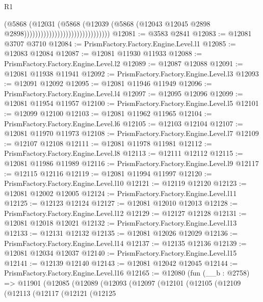 \begin{lexlean}{R1}
\begin{coremodule}
                                                      (@5868
                                                        (@12031
                                                          (@5868
                                                            (@12039
                                                              (@5868
                                                                (@12043
                                                                  @12045
                                                                  @2898
                                                                  @2898)))))))))))))))))))))))))))))))
@12081 := @3583 @2841
@12083 := @12081 @3707 @3710
@12084 := PrismFactory.Factory.Engine.Level.l1
@12085 := @12083 @12084
@12087 := @12081 @11930 @11933
@12088 := PrismFactory.Factory.Engine.Level.l2
@12089 := @12087 @12088
@12091 := @12081 @11938 @11941
@12092 := PrismFactory.Factory.Engine.Level.l3
@12093 := @12091 @12092
@12095 := @12081 @11946 @11949
@12096 := PrismFactory.Factory.Engine.Level.l4
@12097 := @12095 @12096
@12099 := @12081 @11954 @11957
@12100 := PrismFactory.Factory.Engine.Level.l5
@12101 := @12099 @12100
@12103 := @12081 @11962 @11965
@12104 := PrismFactory.Factory.Engine.Level.l6
@12105 := @12103 @12104
@12107 := @12081 @11970 @11973
@12108 := PrismFactory.Factory.Engine.Level.l7
@12109 := @12107 @12108
@12111 := @12081 @11978 @11981
@12112 := PrismFactory.Factory.Engine.Level.l8
@12113 := @12111 @12112
@12115 := @12081 @11986 @11989
@12116 := PrismFactory.Factory.Engine.Level.l9
@12117 := @12115 @12116
@12119 := @12081 @11994 @11997
@12120 := PrismFactory.Factory.Engine.Level.l10
@12121 := @12119 @12120
@12123 := @12081 @12002 @12005
@12124 := PrismFactory.Factory.Engine.Level.l11
@12125 := @12123 @12124
@12127 := @12081 @12010 @12013
@12128 := PrismFactory.Factory.Engine.Level.l12
@12129 := @12127 @12128
@12131 := @12081 @12018 @12021
@12132 := PrismFactory.Factory.Engine.Level.l13
@12133 := @12131 @12132
@12135 := @12081 @12026 @12029
@12136 := PrismFactory.Factory.Engine.Level.l14
@12137 := @12135 @12136
@12139 := @12081 @12034 @12037
@12140 := PrismFactory.Factory.Engine.Level.l15
@12141 := @12139 @12140
@12143 := @12081 @12042 @12045
@12144 := PrismFactory.Factory.Engine.Level.l16
@12165 := @12080
    (fun (__b : @2758) =>
    @11901
      (@12085
        (@12089
          (@12093
            (@12097
              (@12101
                (@12105
                  (@12109
                    (@12113
                      (@12117
                        (@12121
                          (@12125

\end{coremodule}
\end{lexlean}
